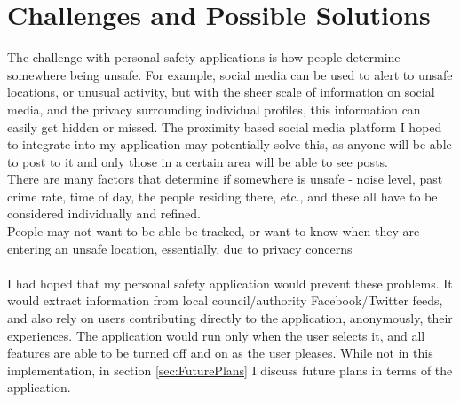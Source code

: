 \documentclass[a4paper]{report}
\begin{document}
\section{Challenges and Possible Solutions}
\label{sec:ChallengesAndSolutions}
  The challenge with personal safety applications is how people determine somewhere being unsafe. For example, social media can be used to alert to unsafe locations, or unusual activity, but with the sheer scale of information on social media, and the privacy surrounding individual profiles, this information can easily get hidden or missed. The proximity based social media platform I hoped to integrate into my application may potentially solve this, as anyone will be able to post to it and only those in a certain area will be able to see posts.
  \\ There are many factors that determine
  if somewhere is unsafe - noise level, past crime rate, time of day, the people residing there, etc., \cite{mccarthy} and these all have to be considered individually and refined.\\
  People may not want to be able be tracked, or want to know when they are entering an unsafe location, essentially, due to privacy concerns  \\ \\
  I had hoped that my personal safety application would prevent these problems. It would extract information from local council/authority Facebook/Twitter feeds, and also rely on users
  contributing directly to the application, anonymously, their experiences. The application would run only when the user selects it, and all features are able to be turned off and on
  as the user pleases. While not in this implementation, in section \ref{sec:FuturePlans} I discuss future plans in terms of the application. 
\end{document}
